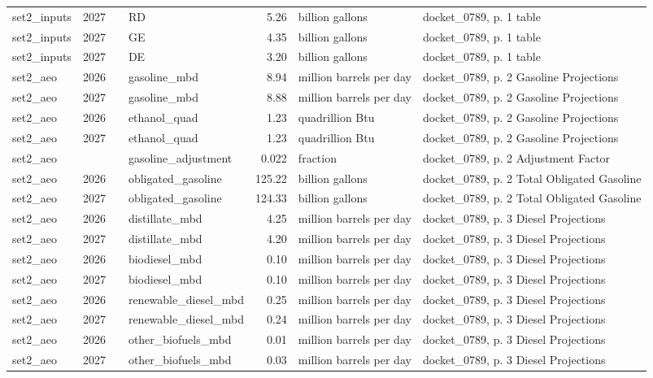 \begin{longtable}{p{2.3cm}p{0.7cm}p{1.0cm}p{2.6cm}rp{1.7cm}p{4.6cm}}
set2\_inputs & 2027 &  & RD & 5.26 & billion gallons & docket\_0789, p. 1 table \\
set2\_inputs & 2027 &  & GE & 4.35 & billion gallons & docket\_0789, p. 1 table \\
set2\_inputs & 2027 &  & DE & 3.20 & billion gallons & docket\_0789, p. 1 table \\
set2\_aeo & 2026 &  & gasoline\_mbd & 8.94 & million barrels per day & docket\_0789, p. 2 Gasoline Projections \\
set2\_aeo & 2027 &  & gasoline\_mbd & 8.88 & million barrels per day & docket\_0789, p. 2 Gasoline Projections \\
set2\_aeo & 2026 &  & ethanol\_quad & 1.23 & quadrillion Btu & docket\_0789, p. 2 Gasoline Projections \\
set2\_aeo & 2027 &  & ethanol\_quad & 1.23 & quadrillion Btu & docket\_0789, p. 2 Gasoline Projections \\
set2\_aeo &  &  & gasoline\_adjustment & 0.022 & fraction & docket\_0789, p. 2 Adjustment Factor \\
set2\_aeo & 2026 &  & obligated\_gasoline & 125.22 & billion gallons & docket\_0789, p. 2 Total Obligated Gasoline \\
set2\_aeo & 2027 &  & obligated\_gasoline & 124.33 & billion gallons & docket\_0789, p. 2 Total Obligated Gasoline \\
set2\_aeo & 2026 &  & distillate\_mbd & 4.25 & million barrels per day & docket\_0789, p. 3 Diesel Projections \\
set2\_aeo & 2027 &  & distillate\_mbd & 4.20 & million barrels per day & docket\_0789, p. 3 Diesel Projections \\
set2\_aeo & 2026 &  & biodiesel\_mbd & 0.10 & million barrels per day & docket\_0789, p. 3 Diesel Projections \\
set2\_aeo & 2027 &  & biodiesel\_mbd & 0.10 & million barrels per day & docket\_0789, p. 3 Diesel Projections \\
set2\_aeo & 2026 &  & renewable\_diesel\_mbd & 0.25 & million barrels per day & docket\_0789, p. 3 Diesel Projections \\
set2\_aeo & 2027 &  & renewable\_diesel\_mbd & 0.24 & million barrels per day & docket\_0789, p. 3 Diesel Projections \\
set2\_aeo & 2026 &  & other\_biofuels\_mbd & 0.01 & million barrels per day & docket\_0789, p. 3 Diesel Projections \\
set2\_aeo & 2027 &  & other\_biofuels\_mbd & 0.03 & million barrels per day & docket\_0789, p. 3 Diesel Projections \\

\end{longtable}
